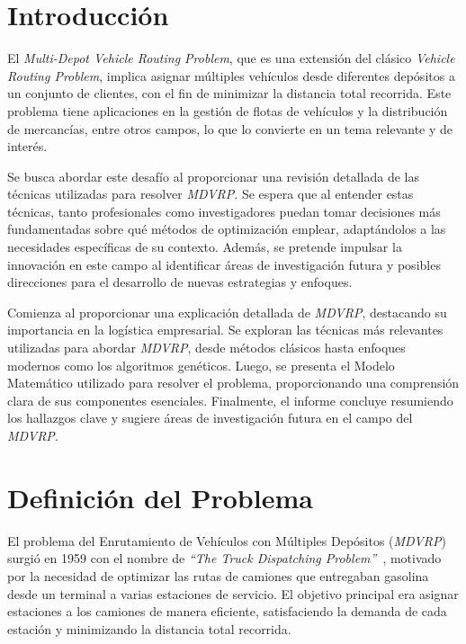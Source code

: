 \documentclass[letter, 10pt]{article}
\begin{document}
\section{Introducción}

El \textit{Multi-Depot Vehicle Routing Problem}, que es una extensión del clásico \textit{Vehicle Routing Problem}, implica asignar múltiples vehículos desde diferentes depósitos a un conjunto de clientes, con el fin de minimizar la distancia total recorrida. Este problema tiene aplicaciones en la gestión de flotas de vehículos y la distribución de mercancías, entre otros campos, lo que lo convierte en un tema relevante y de interés.

Se busca abordar este desafío al proporcionar una revisión detallada de las técnicas utilizadas para resolver \textit{MDVRP}. Se espera que al entender estas técnicas, tanto profesionales como investigadores puedan tomar decisiones más fundamentadas sobre qué métodos de optimización emplear, adaptándolos a las necesidades específicas de su contexto. Además, se pretende impulsar la innovación en este campo al identificar áreas de investigación futura y posibles direcciones para el desarrollo de nuevas estrategias y enfoques.

Comienza al proporcionar una explicación detallada de \textit{MDVRP}, destacando su importancia en la logística empresarial. Se exploran las técnicas más relevantes utilizadas para abordar \textit{MDVRP}, desde métodos clásicos hasta enfoques modernos como los algoritmos genéticos. Luego, se presenta el Modelo Matemático utilizado para resolver el problema, proporcionando una comprensión clara de sus componentes esenciales. Finalmente, el informe concluye resumiendo los hallazgos clave y sugiere áreas de investigación futura en el campo del \textit{MDVRP}.

\section{Definición del Problema}

El problema del Enrutamiento de Vehículos con Múltiples Depósitos (\textit{MDVRP}) surgió en 1959 con el nombre de \textit{``The Truck Dispatching Problem''}~\cite{TruckDispatchingProblem}, motivado por la necesidad de optimizar las rutas de camiones que entregaban gasolina desde un terminal a varias estaciones de servicio. El objetivo principal era asignar estaciones a los camiones de manera eficiente, satisfaciendo la demanda de cada estación y minimizando la distancia total recorrida.
\end{document}
